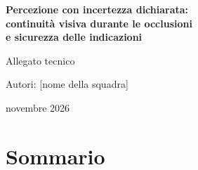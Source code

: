 
\newcommand{\squadra}{[nome della squadra]}

\begin{titlepage}
\centering
\vspace*{4cm}
{\LARGE\bfseries\color{accent} Percezione con incertezza dichiarata:\\[4pt] continuità visiva durante le occlusioni\\[4pt] e sicurezza delle indicazioni\par}
\vspace{1.2cm}
{\Large Allegato tecnico\par}
\vspace{2.5cm}
{\large Autori: \squadra\par}
\vspace{0.8cm}
{\large novembre 2026\par}
\vfill
\end{titlepage}

\section*{Sommario}


\tableofcontents
\clearpage

\clearpage









\clearpage
\appendix


\clearpage
\begingroup\sloppy\def\UrlBreaks{\do\/\do\-\do\_\do\.}


\endgroup

